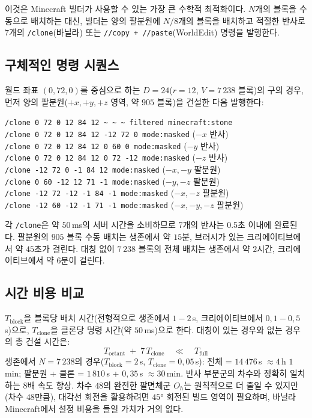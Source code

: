 \documentclass[12pt,a4paper]{scrartcl}
\newcommand{\cmd}[1]{\textcolor{earth}{\texttt{\small #1}}}
\begin{document}
이것은 Minecraft 빌더가 사용할 수 있는 가장 큰 수학적 최적화이다. $N$개의 블록을 수동으로 배치하는 대신, 빌더는 양의 팔분원에 $N/8$개의 블록을 배치하고 적절한 반사로 7개의 \cmd{/clone}(바닐라) 또는 \cmd{//copy + //paste}(WorldEdit) 명령을 발행한다.

\subsection{구체적인 명령 시퀀스}
월드 좌표 $(0,72,0)$를 중심으로 하는 $D=24$($r=12$, $V = 7\,238$ 블록)의 구의 경우, 먼저 양의 팔분원($+x, +y, +z$ 영역, 약 $905$ 블록)을 건설한 다음 발행한다:

\begin{minec}
\cmd{/clone 0 72 0 12 84 12 \textasciitilde\,\textasciitilde\,\textasciitilde\ filtered minecraft:stone}\\
\cmd{/clone 0 72 0 12 84 12 -12 72 0 mode:masked} \quad ($-x$ 반사)\\
\cmd{/clone 0 72 0 12 84 12 0 60 0 mode:masked} \quad\quad ($-y$ 반사)\\
\cmd{/clone 0 72 0 12 84 12 0 72 -12 mode:masked} \quad ($-z$ 반사)\\
\cmd{/clone -12 72 0 -1 84 12 mode:masked} \quad\quad\quad\;\; ($-x,-y$ 팔분원)\\
\cmd{/clone 0 60 -12 12 71 -1 mode:masked} \quad\quad\quad ($-y,-z$ 팔분원)\\
\cmd{/clone -12 72 -12 -1 84 -1 mode:masked} \quad\;\; ($-x,-z$ 팔분원)\\
\cmd{/clone -12 60 -12 -1 71 -1 mode:masked} \quad\;\; ($-x,-y,-z$ 팔분원)
\end{minec}

각 \cmd{/clone}은 약 $50$\,ms의 서버 시간을 소비하므로 7개의 반사는 0.5초 이내에 완료된다. 팔분원의 $905$ 블록 수동 배치는 생존에서 약 $15$분, 브러시가 있는 크리에이티브에서 약 $45$초가 걸린다. 대칭 없이 $7\,238$ 블록의 전체 배치는 생존에서 약 $2$시간, 크리에이티브에서 약 $6$분이 걸린다.

\subsection{시간 비용 비교}
$T_{\mathrm{block}}$을 블록당 배치 시간(전형적으로 생존에서 $1{-}2$\,s, 크리에이티브에서 $0{,}1{-}0{,}5$\,s)으로, $T_{\mathrm{clone}}$을 클론당 명령 시간(약 $50$\,ms)으로 한다. 대칭이 있는 경우와 없는 경우의 총 건설 시간은:
\[
T_{\mathrm{octant}} \;+\; 7\,T_{\mathrm{clone}}
\quad\ll\quad
T_{\mathrm{full}}
\]
생존에서 $N = 7\,238$의 경우($T_{\mathrm{block}} = 2$\,s, $T_{\mathrm{clone}} = 0{,}05$\,s): 전체 = $14\,476$\,s $\approx 4$\,h $1$\,min; 팔분원 + 클론 = $1\,810$\,s + $0{,}35$\,s $\approx 30$\,min. 반사 부분군의 차수와 정확히 일치하는 $8$배 속도 향상. 차수 $48$의 완전한 팔면체군 $O_h$는 원칙적으로 더 줄일 수 있지만(차수 $48$만큼), 대각선 회전을 활용하려면 $45°$ 회전된 빌드 영역이 필요하며, 바닐라 Minecraft에서 설정 비용을 들일 가치가 거의 없다.
\end{document}
